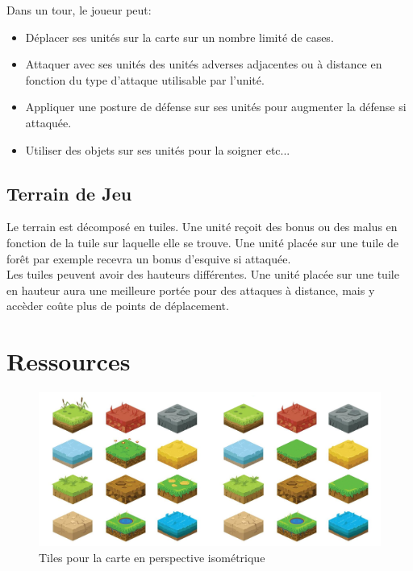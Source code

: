 Dans un tour, le joueur peut: \\

\begin{itemize}
  \item Déplacer ses unités sur la carte sur un nombre limité de cases.
  \item Attaquer avec ses unités des unités adverses adjacentes ou à distance en fonction du type d'attaque utilisable par l'unité. 
  \item Appliquer une posture de défense sur ses unités pour augmenter la défense si attaquée. 
  \item Utiliser des objets sur ses unités pour la soigner etc...

\end{itemize}

\subsection{Terrain de Jeu}

Le terrain est décomposé en tuiles. Une unité reçoit des bonus ou des malus en fonction de la tuile sur laquelle elle se trouve. Une unité placée sur une tuile de forêt par exemple recevra un bonus d'esquive si attaquée.\\

Les tuiles peuvent avoir des hauteurs différentes. Une unité placée sur une tuile en hauteur aura une meilleure portée pour des attaques à distance, mais y accèder coûte plus de points de déplacement.

\section{Ressources}

\begin{figure}[H]
\includegraphics[width=\linewidth]{images/maptiles.png}
\centering
\caption{Tiles pour la carte en perspective isométrique}
\label{fig:img2}
\end{figure}

